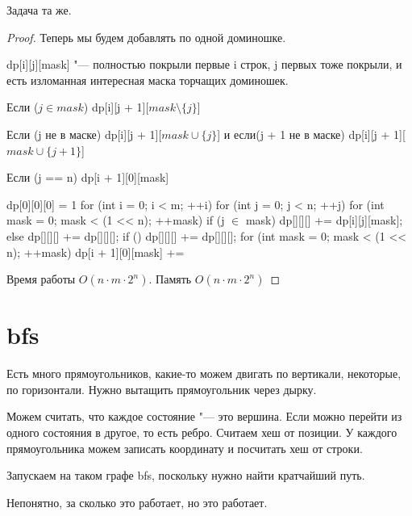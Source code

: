 Задача та же.
\begin{proof}
Теперь мы будем добавлять по одной доминошке.  

dp[i][j][mask] "--- полностью покрыли первые i строк, j первых тоже покрыли, и есть изломанная интересная маска торчащих доминошек.

Если ($j \in mask$) dp[i][j + 1][$mask \setminus \{j\}$]

Если (j не в маске) dp[i][j + 1][$mask \cup \{j\}$] и если(j + 1 не в маске) dp[i][j + 1][$mask \cup \{j + 1\}$]

Если (j == n) dp[i + 1][0][mask]

\begin{cppcode}
dp[0][0][0] = 1
for (int i = 0; i < m; ++i) {
    for (int j = 0; j < n; ++j) {
        for (int mask = 0; mask < (1 << n); ++mask) {
            if (j $\in$ mask) {
                dp[][][] += dp[i][j][mask];
            } else {
                dp[][][] += dp[][][];
                if () {
                    dp[][][] += dp[][][];
                }
            } 
        }
    }
    for (int mask = 0; mask < (1 << n); ++mask) {
        dp[i + 1][0][mask] += 
    }
}
\end{cppcode}

Время работы $O(n \cdot m \cdot 2^n)$.
Память $O(n \cdot m \cdot 2^n)$
\end{proof}
\section{bfs}
Есть много прямоугольников, какие-то можем двигать по вертикали, некоторые, по горизонтали. Нужно вытащить прямоугольник через дырку. 

Можем считать, что каждое состояние "--- это вершина. Если можно перейти из одного состояния в другое, то есть ребро. 
Считаем хеш от позиции. У каждого прямоугольника можем записать координату и посчитать хеш от строки. 

Запускаем на таком графе bfs, поскольку нужно найти кратчайший путь. 

Непонятно, за сколько это работает, но это работает.